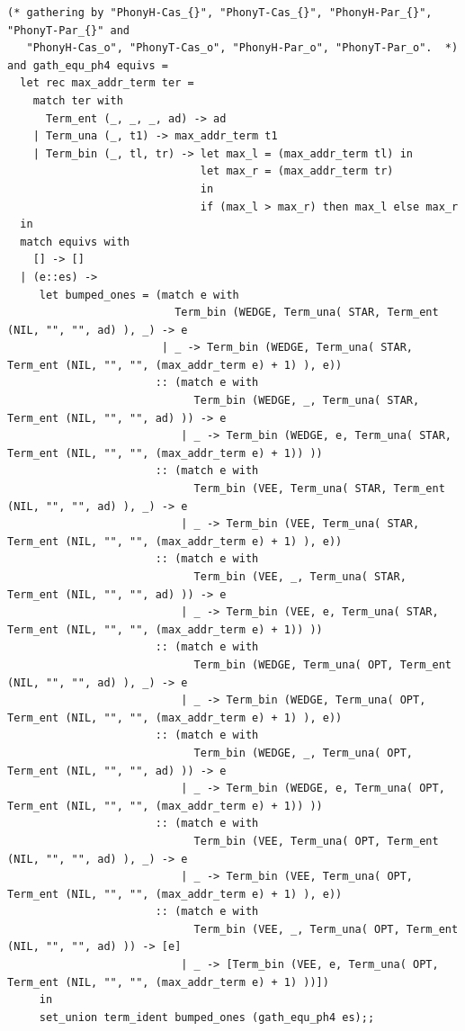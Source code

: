 \documentclass[12pt]{article}
\begin{document}
\begin{tiny}
\begin{verbatim}
(* gathering by "PhonyH-Cas_{}", "PhonyT-Cas_{}", "PhonyH-Par_{}", "PhonyT-Par_{}" and
   "PhonyH-Cas_o", "PhonyT-Cas_o", "PhonyH-Par_o", "PhonyT-Par_o".  *)
and gath_equ_ph4 equivs =
  let rec max_addr_term ter =
    match ter with
      Term_ent (_, _, _, ad) -> ad
    | Term_una (_, t1) -> max_addr_term t1
    | Term_bin (_, tl, tr) -> let max_l = (max_addr_term tl) in
                              let max_r = (max_addr_term tr)
                              in
                              if (max_l > max_r) then max_l else max_r
  in
  match equivs with
    [] -> []
  | (e::es) ->
     let bumped_ones = (match e with
                          Term_bin (WEDGE, Term_una( STAR, Term_ent (NIL, "", "", ad) ), _) -> e
                        | _ -> Term_bin (WEDGE, Term_una( STAR, Term_ent (NIL, "", "", (max_addr_term e) + 1) ), e))
                       :: (match e with
                             Term_bin (WEDGE, _, Term_una( STAR, Term_ent (NIL, "", "", ad) )) -> e
                           | _ -> Term_bin (WEDGE, e, Term_una( STAR, Term_ent (NIL, "", "", (max_addr_term e) + 1)) ))
                       :: (match e with
                             Term_bin (VEE, Term_una( STAR, Term_ent (NIL, "", "", ad) ), _) -> e
                           | _ -> Term_bin (VEE, Term_una( STAR, Term_ent (NIL, "", "", (max_addr_term e) + 1) ), e))
                       :: (match e with
                             Term_bin (VEE, _, Term_una( STAR, Term_ent (NIL, "", "", ad) )) -> e
                           | _ -> Term_bin (VEE, e, Term_una( STAR, Term_ent (NIL, "", "", (max_addr_term e) + 1)) ))
                       :: (match e with
                             Term_bin (WEDGE, Term_una( OPT, Term_ent (NIL, "", "", ad) ), _) -> e
                           | _ -> Term_bin (WEDGE, Term_una( OPT, Term_ent (NIL, "", "", (max_addr_term e) + 1) ), e))
                       :: (match e with
                             Term_bin (WEDGE, _, Term_una( OPT, Term_ent (NIL, "", "", ad) )) -> e
                           | _ -> Term_bin (WEDGE, e, Term_una( OPT, Term_ent (NIL, "", "", (max_addr_term e) + 1)) ))
                       :: (match e with
                             Term_bin (VEE, Term_una( OPT, Term_ent (NIL, "", "", ad) ), _) -> e
                           | _ -> Term_bin (VEE, Term_una( OPT, Term_ent (NIL, "", "", (max_addr_term e) + 1) ), e))
                       :: (match e with
                             Term_bin (VEE, _, Term_una( OPT, Term_ent (NIL, "", "", ad) )) -> [e]
                           | _ -> [Term_bin (VEE, e, Term_una( OPT, Term_ent (NIL, "", "", (max_addr_term e) + 1) ))])
     in
     set_union term_ident bumped_ones (gath_equ_ph4 es);;





\end{verbatim}
\end{tiny}
\end{document}
